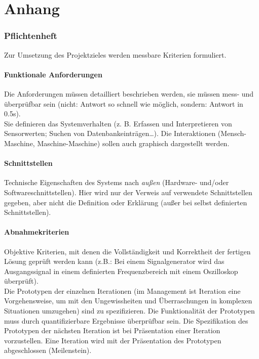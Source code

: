 \documentclass[12pt,a4paper]{article}
\newcommand{\yhbu}[0]{\color{ydkbu}}	%
\begin{document}
{%
\clearpage\vfill\newpage{}
\appendix
\part*{\sc Anhang}
\renewcommand{\thesection}{\arabic{section}\;}
\setcounter{section}{5}
\section{\sc Pflichtenheft}
	{\yhbu
	Zur Umsetzung des Projektzieles werden messbare Kriterien formuliert.
	}
 \subsection{Funktionale Anforderungen}
	{\yhbu
	Die Anforderungen müssen detailliert beschrieben werden,
	sie müssen mess- und überprüfbar sein
	(nicht: \dq{}Antwort so schnell wie möglich\dq{}, sondern: \dq{}Antwort in 0.5s\dq{}).
	\\[1mm]
	Sie definieren das Systemverhalten
	(z. B. Erfassen und Interpretieren von Sensorwerten;
	Suchen von Datenbankeinträgen\ldots).
	Die Interaktionen (Mensch-Maschine, Maschine-Maschine)
	sollen auch graphisch dargestellt werden.
	}

 \subsection{Schnittstellen}
	{\yhbu
	Technische Eigenschaften des Systems nach {\em außen}
	(Hardware- und\slash{}oder Softwareschnittstellen).
	Hier wird nur der Verweis auf verwendete Schnittstellen gegeben,
	aber nicht die Definition oder Erklärung
	(außer bei selbst definierten Schnittstellen).
	}

 \subsection{Abnahmekriterien}
	{\yhbu
	Objektive Kriterien,
	mit denen die Vollständigkeit und Korrektheit
	der fertigen Lösung geprüft werden kann
	(z.B.: Bei einem Signalgenerator wird das Ausgangssignal
	in einem definierten Frequenzbereich mit einem Oszilloskop überprüft).
	\\[1mm]
	Die Prototypen der einzelnen Iterationen
	(im Management ist Iteration eine Vorgehensweise,
	um mit den Ungewissheiten und Überraschungen in komplexen Situationen umzugehen)
	sind zu spezifizieren.
	Die Funktionalität der Prototypen muss durch quantifizierbare Ergebnisse überprüfbar sein.
	Die Spezifikation des Prototypen der nächsten Iteration
	ist bei Präsentation einer Iteration vorzustellen.
	Eine Iteration wird mit der Präsentation des Prototypen abgeschlossen (Meilenstein).
	}

}
\end{document}
